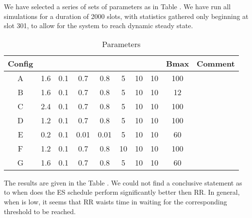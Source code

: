 \documentclass[12 pt]{article}
\newcommand{\debug}[1]{\mbox{\tt #1}}
\renewcommand{\debug}[1]{}              \newcommand{\cmd}[1]{}
\begin{document}
We have selected a series of sets of parameters as in Table .  We have run all simulations for a duration of 2000 slots, with statistics gathered only beginning at slot 301, to allow for the system to reach dynamic steady state.

\begin{table}[hbtp]
\begin{center}
\begin{tabular}{|c|c|c|c|c|c|c|c|c|l|}
\hline
Config &  &    &      &  &  &     &  & Bmax & Comment \\ \hline
A &  1.6 & 0.1 & 0.7 & 0.8 & 5 & 10 & 10 & 100 &    \\  \hline
B & 1.6 & 0.1 & 0.7 & 0.8 & 5 & 10 & 10 & 12 &     \\  \hline
C & 2.4 & 0.1 & 0.7 & 0.8 & 5 & 10 & 10 & 100 &     \\  \hline
D & 1.2 & 0.1 & 0.7 & 0.8 & 5 & 10 & 10 & 100 &      \\  \hline
E & 0.2  & 0.1 & 0.01 & 0.01 & 5 & 10 & 10 & 60 &    \\  \hline
F & 1.2 & 0.1 & 0.7 & 0.8 & 10 & 10 & 10 & 100 &      \\  \hline
G & 1.6 & 0.1 & 0.7 & 0.8 & 5 & 10 & 10 & 60 &       \\  \hline
\end{tabular}
\caption{Parameters\debug{\fbox{Table-Param}}\label{Table-Param}}
\end{center}
\end{table}

The results are given in the Table .  We could not find a conclusive statement as to when does the ES schedule perform significantly better then RR.  In general, when  is low, it seems that RR waists time in waiting for the corresponding threshold to be reached.
\end{document}
